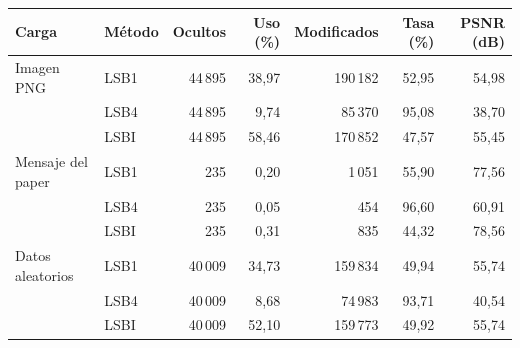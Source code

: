 \begin{tabular}{llrrrrr}
\toprule
Carga & Método & Ocultos & Uso (\%) & Modificados & Tasa (\%) & PSNR (dB) \\
\midrule
Imagen PNG & LSB1 & 44\,895 & 38{,}97 & 190\,182 & 52{,}95 & 54{,}98 \\
 & LSB4 & 44\,895 & 9{,}74 & 85\,370 & 95{,}08 & 38{,}70 \\
 & LSBI & 44\,895 & 58{,}46 & 170\,852 & 47{,}57 & 55{,}45 \\
\midrule
Mensaje del paper & LSB1 & 235 & 0{,}20 & 1\,051 & 55{,}90 & 77{,}56 \\
 & LSB4 & 235 & 0{,}05 & 454 & 96{,}60 & 60{,}91 \\
 & LSBI & 235 & 0{,}31 & 835 & 44{,}32 & 78{,}56 \\
\midrule
Datos aleatorios & LSB1 & 40\,009 & 34{,}73 & 159\,834 & 49{,}94 & 55{,}74 \\
 & LSB4 & 40\,009 & 8{,}68 & 74\,983 & 93{,}71 & 40{,}54 \\
 & LSBI & 40\,009 & 52{,}10 & 159\,773 & 49{,}92 & 55{,}74 \\
\bottomrule
\end{tabular}
